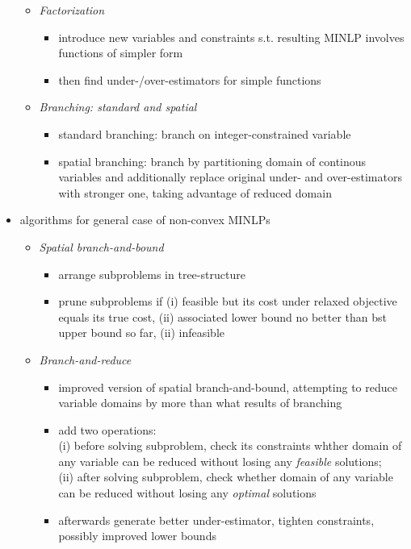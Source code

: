 \documentclass{article}
\begin{document}
\begin{itemize}
\begin{itemize}
\begin{itemize}
		\end{itemize}
	\item \emph{Factorization}
		\begin{itemize}
		\item introduce new variables and constraints s.t. resulting MINLP involves functions of simpler form
		\item then find under-/over-estimators for simple functions
		\end{itemize}
	\item \emph{Branching: standard and spatial}
		\begin{itemize}
		\item standard branching: branch on integer-constrained variable
		\item spatial branching: branch by partitioning domain of continous variables and additionally replace original under- and over-estimators with stronger one, taking advantage of reduced domain
		\end{itemize}
	\end{itemize}
\item algorithms for general case of non-convex MINLPs
	\begin{itemize}
	\item \emph{Spatial branch-and-bound}
		\begin{itemize}
		\item arrange subproblems in tree-structure
		\item prune subproblems if (i) feasible but its cost under relaxed objective equals its true cost, (ii) associated lower bound no better than bst upper bound so far, (ii) infeasible
		\end{itemize}
	\item \emph{Branch-and-reduce}
		\begin{itemize}
		\item improved version of spatial branch-and-bound, attempting to reduce variable domains by more than what results of branching
		\item add two operations:\\ (i) before solving subproblem, check its constraints whther domain of any variable can be reduced without losing any \emph{feasible} solutions;\\ (ii) after solving subproblem, check whether domain of any variable can be reduced without losing any \emph{optimal} solutions
		\item afterwards generate better under-estimator, tighten constraints, possibly improved lower bounds

\end{itemize}
\end{itemize}
\end{itemize}
\end{document}
